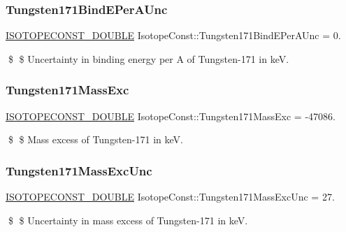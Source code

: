 \subsubsection{\texorpdfstring{Tungsten171\+Bind\+E\+Per\+A\+Unc}{Tungsten171BindEPerAUnc}}
{\footnotesize\ttfamily \mbox{\hyperlink{group___isotope_const-_macros_ga8f45a7272ce02c0b4c65c44636ed719a}{I\+S\+O\+T\+O\+P\+E\+C\+O\+N\+S\+T\+\_\+\+D\+O\+U\+B\+LE}} Isotope\+Const\+::\+Tungsten171\+Bind\+E\+Per\+A\+Unc = 0.}

\$ \$ Uncertainty in binding energy per A of Tungsten-\/171 in keV. \mbox{\label{group___isotope_const-_tungsten-_w171_ga00f249c74aff02ea33c432641be4f6f5}} 
\subsubsection{\texorpdfstring{Tungsten171\+Mass\+Exc}{Tungsten171MassExc}}
{\footnotesize\ttfamily \mbox{\hyperlink{group___isotope_const-_macros_ga8f45a7272ce02c0b4c65c44636ed719a}{I\+S\+O\+T\+O\+P\+E\+C\+O\+N\+S\+T\+\_\+\+D\+O\+U\+B\+LE}} Isotope\+Const\+::\+Tungsten171\+Mass\+Exc = -\/47086.}

\$ \$ Mass excess of Tungsten-\/171 in keV. \mbox{\label{group___isotope_const-_tungsten-_w171_gaa659066720874fe5d94441bc295d83e4}} 
\subsubsection{\texorpdfstring{Tungsten171\+Mass\+Exc\+Unc}{Tungsten171MassExcUnc}}
{\footnotesize\ttfamily \mbox{\hyperlink{group___isotope_const-_macros_ga8f45a7272ce02c0b4c65c44636ed719a}{I\+S\+O\+T\+O\+P\+E\+C\+O\+N\+S\+T\+\_\+\+D\+O\+U\+B\+LE}} Isotope\+Const\+::\+Tungsten171\+Mass\+Exc\+Unc = 27.}

\$ \$ Uncertainty in mass excess of Tungsten-\/171 in keV. \mbox{\label{group___isotope_const-_tungsten-_w171_ga6bd09a8cb3516ccd50f0a9b282f390c0}} 
